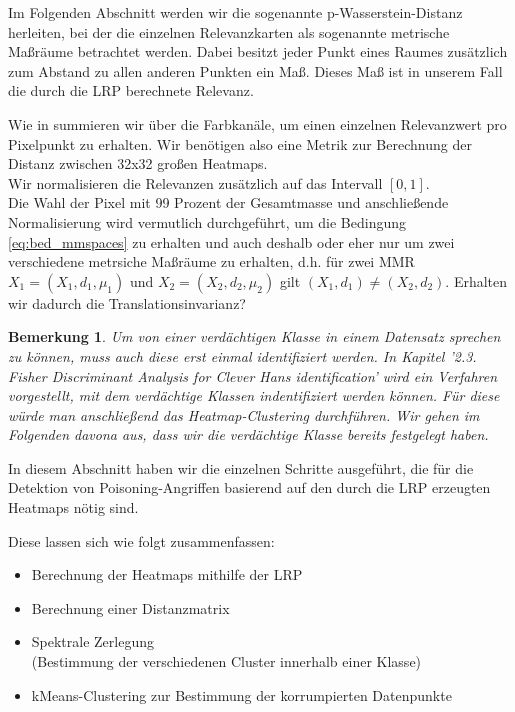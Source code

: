 \documentclass[11pt,a4paper]{article}
\newtheorem{remark}[theorem]{Bemerkung}
\numberwithin{equation}{section}
\begin{document}
	Im Folgenden Abschnitt werden wir die sogenannte p-Wasserstein-Distanz herleiten, bei der die einzelnen Relevanzkarten als sogenannte metrische Maßräume betrachtet werden. Dabei besitzt jeder Punkt eines Raumes zusätzlich zum Abstand zu allen anderen Punkten ein Maß. Dieses Maß ist in unserem Fall die durch die LRP berechnete Relevanz.  
	
	Wie in \cite{imagenet_unhansed_v1} summieren wir über die Farbkanäle, um einen einzelnen Relevanzwert pro Pixelpunkt zu erhalten. Wir benötigen also eine Metrik zur Berechnung der Distanz zwischen 32x32 großen Heatmaps.\\
	Wir normalisieren die Relevanzen zusätzlich auf das Intervall $[0,1]$.\\
	Die Wahl der Pixel mit 99 Prozent der Gesamtmasse und anschließende Normalisierung wird vermutlich durchgeführt, um die Bedingung \autoref{eq:bed_mmspaces} zu erhalten und auch deshalb oder eher nur um zwei verschiedene metrsiche Maßräume zu erhalten, d.h. für zwei MMR $X_1=(X_1,d_1,\mu_1)$ und $X_2=(X_2,d_2,\mu_2)$ gilt $(X_1,d_1) \neq (X_2,d_2)$. Erhalten wir dadurch die Translationsinvarianz?\\
	
	
	\begin{remark}
		Um von einer verdächtigen Klasse in einem Datensatz sprechen zu können, muss auch diese erst einmal identifiziert werden.
		In \cite{imagenet_unhansed_v1} Kapitel '2.3. Fisher Discriminant Analysis for Clever Hans
		identification' wird ein Verfahren vorgestellt, mit dem verdächtige Klassen indentifiziert werden können. Für diese würde man anschließend das Heatmap-Clustering durchführen. Wir gehen im Folgenden davona aus, dass wir die verdächtige Klasse bereits festgelegt haben.
	\end{remark}
	
	In diesem Abschnitt haben wir die einzelnen Schritte ausgeführt, die für die Detektion von Poisoning-Angriffen basierend auf den durch die LRP erzeugten Heatmaps nötig sind.
	
	Diese lassen sich wie folgt zusammenfassen:	
	\begin{itemize}
		\item Berechnung der Heatmaps mithilfe der LRP\\
		\item Berechnung einer Distanzmatrix \\
		\item Spektrale Zerlegung
		\\ (Bestimmung der verschiedenen Cluster innerhalb einer Klasse)\\
		\item kMeans-Clustering zur Bestimmung der korrumpierten Datenpunkte\\
	\end{itemize}
	
\end{document}

